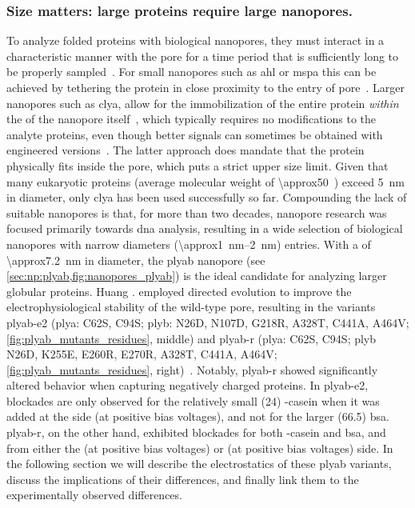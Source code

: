 \subsubsection{Size matters: large proteins require large nanopores.}
%

To analyze folded proteins with biological nanopores, they must interact in a characteristic manner with the
pore for a time period that is sufficiently long to be properly sampled~\cite{Willems-VanMeervelt-2017}. For
small nanopores such as \gls{ahl} or \gls{mspa} this can be achieved by tethering the protein in close
proximity to the entry of pore~\cite{Movileanu-2000,Fahie-2015,Ho-2015,Laszlo-2016,Thakur-2019}. Larger
nanopores such as \gls{clya}, allow for the immobilization of the entire protein \emph{within} the \lumen{} of
the nanopore
itself~\cite{Soskine-2012,Soskine-2013,Soskine-Biesemans-2015,Biesemans-2015,Wloka-2016,VanMeervelt-2017,Galenkamp-2018,Galenkamp-2020},
which typically requires no modifications to the analyte proteins, even though better signals can sometimes be
obtained with engineered versions~\cite{Soskine-Biesemans-2015,Galenkamp-2020}. The latter approach does
mandate that the protein physically fits inside the pore, which puts a strict upper size limit. Given that
many eukaryotic proteins (average molecular weight of \SI{\approx50}{\kDa}~\cite{Kozlowski-2016}) exceed
\SI{5}{\nm} in diameter, only \gls{clya} has been used successfully so far. Compounding the lack of suitable
nanopores is that, for more than two decades, nanopore research was focused primarily towards \gls{dna}
analysis, resulting in a wide selection of biological nanopores with narrow diameters
(\SIrange{\approx1}{2}{\nm}) entries. With a \lumen{} of \SI{\approx7.2}{\nm} in diameter, the \gls{plyab}
nanopore (see \cref{sec:np:plyab,fig:nanopores_plyab}) is the ideal candidate for analyzing larger globular
proteins. Huang \etal. employed directed evolution to improve the electrophysiological stability of the
wild-type pore, resulting in the variants \gls{plyab-e2} (\gls{plya}: C62S, C94S; \gls{plyb}: N26D, N107D,
G218R, A328T, C441A, A464V; \cref{fig:plyab_mutants_residues}, middle) and \gls{plyab-r} (\gls{plya}: C62S,
C94S; \gls{plyb} N26D, K255E, E260R, E270R, A328T, C441A, A464V; \cref{fig:plyab_mutants_residues},
right)~\cite{Huang-2020}. Notably, \gls{plyab-r} showed significantly altered behavior when capturing
negatively charged proteins. In \gls{plyab-e2}, blockades are only observed for the relatively small
(\SI{24}{\kDa}) \tb-casein when it was added at the \transi{} side (at positive bias voltages), and not for
the larger (\SI{66.5}{\kDa}) \gls{bsa}. \gls{plyab-r}, on the other hand, exhibited blockades for both
\tb-casein and \gls{bsa}, and from either the \cisi{} (at positive bias voltages) or \transi{} (at positive
bias voltages) side. In the following section we will describe the electrostatics of these \gls{plyab}
variants, discuss the implications of their differences, and finally link them to the experimentally observed
differences.

